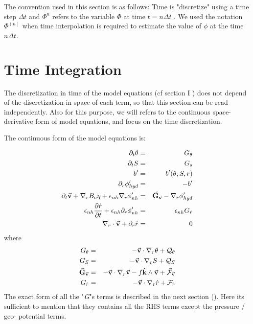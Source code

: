 
The convention used in this section is as follows:
Time is "discretize" using a time step $\Delta t$   
and $\Phi^n$ refers to the variable $\Phi$ 
at time $t = n \Delta t$ . We used the notation $\Phi^{(n)}$
when time interpolation is required to estimate the value of $\phi$
at the time $n \Delta t$.

\section{Time Integration}

The discretization in time of the model equations (cf section I )
does not depend of the discretization in space of each
term, so that this section can be read independently.
Also for this purpose, we will refers to the continuous 
space-derivative form of model equations, and focus on 
the time discretization.
 
The continuous form of the model equations is:

\begin{eqnarray}
\partial_t \theta & = & G_\theta
\\
\partial_t S & = & G_s
\\
b' & = & b'(\theta,S,r)
\\
\partial_r \phi'_{hyd} & = & -b'
\label{eq-r-split-hyd}
\\
\partial_t \vec{\bf v}
+ {\bf \nabla}_r B_o \eta
+ \epsilon_{nh} {\bf \nabla}_r \phi'_{nh}
& = & \vec{\bf G}_{\vec{\bf v}} 
- {\bf \nabla}_r \phi'_{hyd}
\label{eq-r-split-hmom}
\\
\epsilon_{nh} \frac {\partial{\dot{r}}}{\partial{t}}
+ \epsilon_{nh} \partial_r \phi'_{nh}
& = & \epsilon_{nh} G_{\dot{r}} 
\label{eq-r-split-rdot}
\\
{\bf \nabla}_r \cdot \vec{\bf v} + \partial_r \dot{r}
& = & 0
\label{eq-r-cont}
\end{eqnarray}
where
\begin{eqnarray*}
G_\theta & = &
- \vec{\bf v} \cdot {\bf \nabla}_r \theta + {\cal Q}_\theta
\\
G_S & = &
- \vec{\bf v} \cdot {\bf \nabla}_r S + {\cal Q}_S
\\
\vec{\bf G}_{\vec{\bf v}}
& = &
- \vec{\bf v} \cdot {\bf \nabla}_r \vec{\bf v}
- f \hat{\bf k} \wedge \vec{\bf v}
+ \vec{\cal F}_{\vec{\bf v}}
\\
G_{\dot{r}}
& = &
- \vec{\bf v} \cdot {\bf \nabla}_r \dot{r}
+ {\cal F}_{\dot{r}}
\end{eqnarray*}
The exact form of all the "{\it G}"s terms is described in the next
section (). Here its sufficient to mention that they contains
all the RHS terms except the pressure / geo- potential terms.


